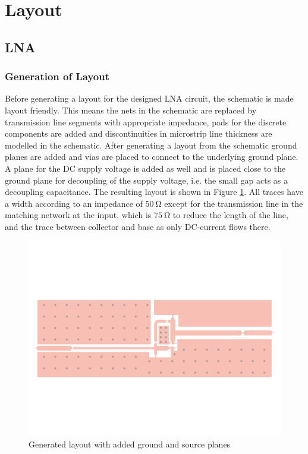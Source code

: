 \documentclass[a4paper]{article}        %
\begin{document}
\section{Layout}
	\subsection{LNA}
		\subsubsection{Generation of Layout}
			Before generating a layout for the designed LNA circuit, the schematic is made layout friendly. This means the nets in the schematic are replaced by transmission line segments with appropriate impedance, pads for the discrete components are added and discontinuities in microstrip line thickness are modelled in the schematic. After generating a layout from the schematic ground planes are added and vias are placed to connect to the underlying ground plane. A plane for the DC supply voltage is added as well and is placed close to the ground plane for decoupling of the supply voltage, i.e. the small gap acts as a decoupling capacitance. The resulting layout is shown in Figure \ref{fig:lna_layout}. All traces have a width according to an impedance of $\SI{50}{\ohm}$ except for the transmission line in the matching network at the input, which is $\SI{75}{\ohm}$ to reduce the length of the line, and the trace between collector and base as only DC-current flows there. 

			\begin{figure}[H]
			\centering
				\includegraphics[width=\textwidth]{fig/LNA/LNA_layout.pdf}
				\caption{Generated layout with added ground and source planes}
				\label{fig:lna_layout}
			\end{figure}
\end{document}

